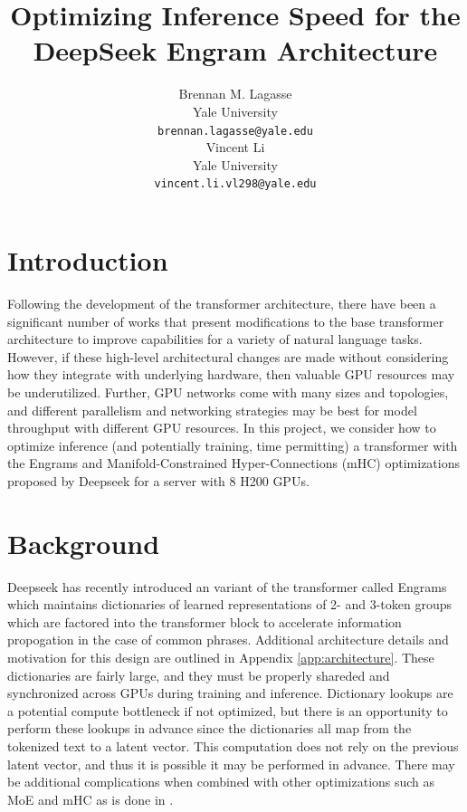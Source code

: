 \documentclass{article}
\title{Optimizing Inference Speed for the DeepSeek Engram Architecture}
\author{%
  Brennan M. Lagasse \\
  Yale University \\
  \texttt{brennan.lagasse@yale.edu} \\
  \And
  Vincent Li\\
  Yale University\\
  \texttt{vincent.li.vl298@yale.edu} \\
}
\begin{document}
\maketitle

\section{Introduction}

Following the development of the transformer architecture, there have been a significant number of works that present modifications to the base transformer architecture to improve capabilities for a variety of natural language tasks. However, if these high-level architectural changes are made without considering how they integrate with underlying hardware, then valuable GPU resources may be underutilized. Further, GPU networks come with many sizes and topologies, and different parallelism and networking strategies may be best for model throughput with different GPU resources. In this project, we consider how to optimize inference (and potentially training, time permitting) a transformer with the Engrams and Manifold-Constrained Hyper-Connections (mHC) optimizations proposed by Deepseek for a server with 8 H200 GPUs.

\section{Background}

Deepseek has recently introduced an variant of the transformer called Engrams which maintains dictionaries of learned representations of 2- and 3-token groups which are factored into the transformer block to accelerate information propogation in the case of common phrases. Additional architecture details and motivation for this design are outlined in Appendix \ref{app:architecture}. These dictionaries are fairly large, and they must be properly shareded and synchronized across GPUs during training and inference. Dictionary lookups are a potential compute bottleneck if not optimized, but there is an opportunity to perform these lookups in advance since the dictionaries all map from the tokenized text to a latent vector. This computation does not rely on the previous latent vector, and thus it is possible it may be performed in advance. There may be additional complications when combined with other optimizations such as MoE and mHC as is done in \cite{cheng_conditional_2026}.
\end{document}
